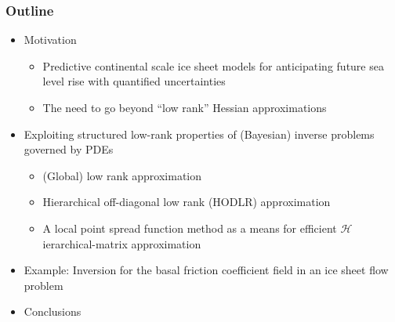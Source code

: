 \documentclass[10pt,final,xcolor=dvipsnames,aspect ratio=169]{beamer}
\begin{document}
\begin{frame}[t]
	\frametitle{Outline}
	
	\begin{itemize}
		\setlength\itemsep{1.0em}
		\item Motivation
		\vspace{0.02in}
		\begin{itemize}
			\setlength\itemsep{1.0em}
			\item Predictive continental scale ice sheet models for anticipating future sea level rise with quantified uncertainties
			\vspace{0.02in}
			\item The need to go beyond ``low rank'' Hessian approximations
		\end{itemize}
		\vspace{0.02in}
		\item Exploiting structured low-rank properties of (Bayesian) inverse problems governed by PDEs
		\vspace{0.02in}
		\begin{itemize}
			\setlength\itemsep{1.0em}
			\item (Global) low rank approximation
			\vspace{0.02in}
			\item Hierarchical off-diagonal low rank (HODLR) approximation
			\vspace{0.02in}
			\item A local point spread function method as a means for efficient
			$\mathcal{H}$ierarchical-matrix approximation
		\end{itemize}
		\vspace{0.02in}
		\item Example: Inversion for the basal friction
		coefficient field in an ice sheet flow problem
		\vspace{0.02in}
		\item Conclusions
	\end{itemize}
	
\end{frame}
\end{document}

